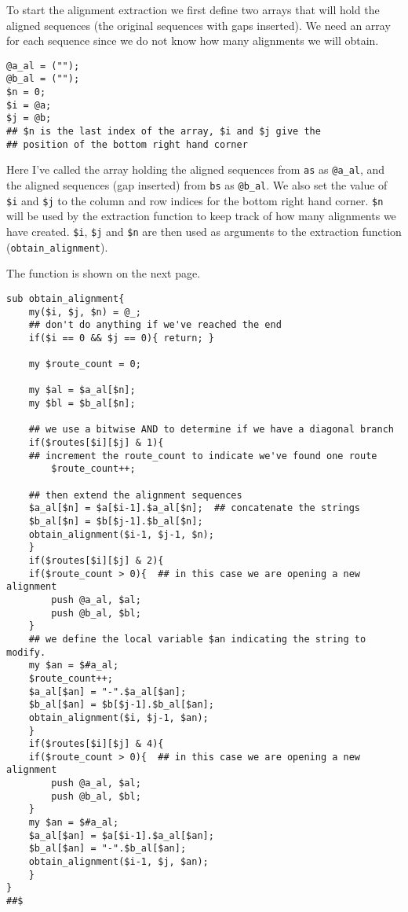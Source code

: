 \documentclass[11pt]{article}
\renewcommand\scriptsize\normalsize
\begin{document}
To start the alignment extraction we first define two arrays that will hold the
aligned sequences (the original sequences with gaps inserted). We need an array
for each sequence since we do not know how many alignments we will obtain. 

\begin{verbatim}
@a_al = ("");
@b_al = ("");
$n = 0; 
$i = @a;
$j = @b;
## $n is the last index of the array, $i and $j give the 
## position of the bottom right hand corner
\end{verbatim}

Here I've called the array holding the aligned sequences from \texttt{as} as
\texttt{@a\_al}, and the aligned sequences (gap inserted) from \texttt{bs} as
\texttt{@b\_al}. We also set the value of \texttt{\$i} and \texttt{\$j} to the
column and row indices for the bottom right hand corner. \texttt{\$n} will
be used by the extraction function to keep track of how many alignments we
have created. \texttt{\$i}, \texttt{\$j} and \texttt{\$n} are then used as
arguments to the extraction function (\texttt{obtain\_alignment}).

The function is shown on the next page.

\begin{verbatim}
sub obtain_alignment{
    my($i, $j, $n) = @_;
    ## don't do anything if we've reached the end
    if($i == 0 && $j == 0){ return; }

    my $route_count = 0;
    
    my $al = $a_al[$n];
    my $bl = $b_al[$n];
    
    ## we use a bitwise AND to determine if we have a diagonal branch
    if($routes[$i][$j] & 1){
	## increment the route_count to indicate we've found one route
        $route_count++;  

	## then extend the alignment sequences
	$a_al[$n] = $a[$i-1].$a_al[$n];  ## concatenate the strings
	$b_al[$n] = $b[$j-1].$b_al[$n];
	obtain_alignment($i-1, $j-1, $n); 
    }
    if($routes[$i][$j] & 2){
	if($route_count > 0){  ## in this case we are opening a new alignment
	    push @a_al, $al;
	    push @b_al, $bl;
	}
	## we define the local variable $an indicating the string to modify.
	my $an = $#a_al;
	$route_count++;
	$a_al[$an] = "-".$a_al[$an];
	$b_al[$an] = $b[$j-1].$b_al[$an];
	obtain_alignment($i, $j-1, $an); 
    }
    if($routes[$i][$j] & 4){
	if($route_count > 0){  ## in this case we are opening a new alignment
	    push @a_al, $al;
	    push @b_al, $bl;
	}
	my $an = $#a_al;
	$a_al[$an] = $a[$i-1].$a_al[$an];
	$b_al[$an] = "-".$b_al[$an];
	obtain_alignment($i-1, $j, $an);
    }
}
##$
\end{verbatim}
\end{document}
